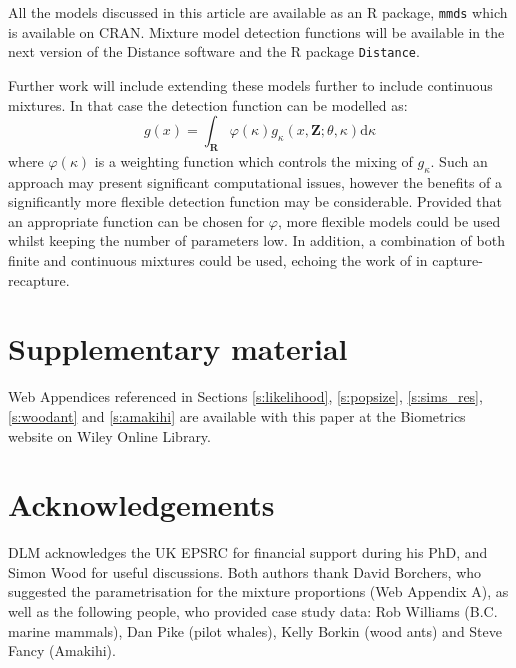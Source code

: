 \documentclass[useAMS,referee,usenatbib]{biom}
\begin{document}
All the models discussed in this article are available as an \textsf{R} package, \texttt{mmds} which is available on CRAN. Mixture model detection functions will be available in the next version of the Distance software and the \textsf{R} package \texttt{Distance}.

Further work will include extending these models further to include continuous mixtures. In that case the detection function can be modelled as:
\begin{equation*}
g(x) = \int_\mathbf{R} \varphi(\kappa) g_\kappa(x,\mathbf{Z}; \theta, \kappa) \text{d}\kappa
\end{equation*}
where $\varphi(\kappa)$ is a weighting function which controls the mixing of $g_\kappa$. Such an approach may present significant computational issues, however the benefits of a significantly more flexible detection function may be considerable. Provided that an appropriate function can be chosen for $\varphi$, more flexible models could be used whilst keeping the number of parameters low. In addition, a combination of both finite and continuous mixtures could be used, echoing the work of \cite{Morgan:2008wy} in capture-recapture.

\backmatter

\section*{Supplementary material}

Web Appendices referenced in Sections \ref{s:likelihood}, \ref{s:popsize}, \ref{s:sims_res}, \ref{s:woodant} and \ref{s:amakihi} are available with this paper at the Biometrics website on Wiley Online Library.

\section*{Acknowledgements}

DLM acknowledges the UK EPSRC for financial support during his PhD, and Simon Wood for useful discussions.  Both authors thank David Borchers, who suggested the parametrisation for the mixture proportions (Web Appendix A), as well as the following people, who provided case study data: Rob Williams (B.C. marine mammals), Dan Pike (pilot whales), Kelly Borkin (wood ants) and Steve Fancy (Amakihi).




\label{lastpage}
\end{document}

